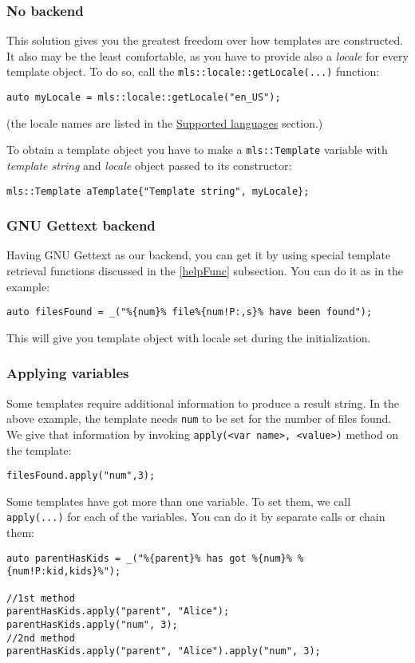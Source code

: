 \subsubsection{No backend}
This solution gives you the greatest freedom over how templates are constructed. It also may be the least comfortable, as you have to
provide also a \emph{locale} for every template object. To do so, call the \verb+mls::locale::getLocale(...)+ function:
\begin{verbatim}
auto myLocale = mls::locale::getLocale("en_US");
\end{verbatim}
(the locale names are listed in the \hyperref[supLangs]{Supported languages} section.)

To obtain a template object you have to make a \verb+mls::Template+ variable with \emph{template string} and \emph{locale} object passed to its constructor:
\begin{verbatim}
mls::Template aTemplate{"Template string", myLocale};
\end{verbatim}

\subsubsection{GNU Gettext backend}
Having GNU Gettext as our backend, you can get it by using special template retrieval functions discussed in the \ref{helpFunc} subsection. 
You can do it as in the example:
\begin{verbatim}
auto filesFound = _("%{num}% file%{num!P:,s}% have been found");
\end{verbatim}
This will give you template object with locale set during the initialization.

\subsubsection{Applying variables}
Some templates require additional information to produce a result string.
In the above example, the template needs \texttt{num} to be set for the number of files found.
We give that information by invoking \verb+apply(<var name>, <value>)+ method on the template:
\begin{verbatim}
filesFound.apply("num",3);
\end{verbatim}
Some templates have got more than one variable. To set them, we call \verb+apply(...)+ for each of the variables.
You can do it by separate calls or chain them:
\begin{verbatim}
auto parentHasKids = _("%{parent}% has got %{num}% %{num!P:kid,kids}%");

//1st method
parentHasKids.apply("parent", "Alice");
parentHasKids.apply("num", 3);
//2nd method
parentHasKids.apply("parent", "Alice").apply("num", 3);
\end{verbatim}

